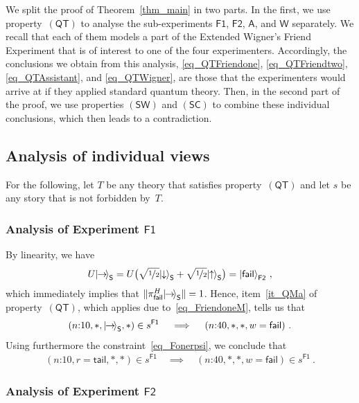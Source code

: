 \documentclass[12pt]{article}
\theoremstyle{plain}
\theoremstyle{definition}
\newcommand*{\ket}[1]{{| #1 \rangle}}
\newcommand*{\Friendone}{\mathsf{F1}}
\newcommand*{\Friendtwo}{\mathsf{F2}}
\newcommand*{\Assistant}{\mathsf{A}}
\newcommand*{\Wigner}{\mathsf{W}}
\newcommand*{\Spin}{\mathsf{S}}
\newcommand*{\spinup}{\ket{{\hspace{-0.1ex}\uparrow\hspace{-0.1ex}}}}
\newcommand*{\spindown}{\ket{{\hspace{-0.1ex}\downarrow\hspace{-0.1ex}}}}
\newcommand*{\spinright}{\ket{{\hspace{-0.2ex}\rightarrow\hspace{-0.4ex}}}}
\newcommand*{\QT}{\mathsf{(QT)}}
\newcommand*{\SW}{\mathsf{(SW)}}
\newcommand*{\SelfCons}{\mathsf{(SC)}}
\newcommand*{\fail}{\mathsf{fail}}
\newcommand*{\tail}{\mathsf{tail}}
\begin{document}
We split the proof of Theorem~\ref{thm_main} in two parts. In the first, we use property~$\QT$ to analyse the sub-experiments $\Friendone$, $\Friendtwo$, $\Assistant$, and $\Wigner$ separately.  We recall that each of them models a part of the Extended Wigner's Friend Experiment that is of interest to one of the four experimenters. Accordingly,  the conclusions we obtain from this analysis, \eqref{eq_QTFriendone}, \eqref{eq_QTFriendtwo},  \eqref{eq_QTAssistant}, and \eqref{eq_QTWigner}, are those that the experimenters would arrive at if they applied standard quantum theory.  Then, in the second part of the proof, we use properties $\SW$ and $\SelfCons$ to combine these individual conclusions, which then leads to a contradiction. 

\subsection{Analysis of individual views} \label{sec_analysisindividual}

For the following, let $T$ be any theory that satisfies property~$\QT$ and let $s$ be any story that is not forbidden by~$T$.

\subsubsection*{Analysis of Experiment $\Friendone$} 

 By linearity, we have
\begin{align*}
  U \spinright_\Spin 
  = U \bigl(  \sqrt{\nicefrac{1}{2}} \spindown_\Spin + \sqrt{\nicefrac{1}{2}} \spinup_\Spin \bigr) 
  = \ket{\fail}_{\Friendtwo}  \ ,
\end{align*}
which immediately implies that $\|\pi_{\fail}^H \spinright_{\Spin}\| = 1$. Hence, item~\ref{it_QMa} of property~$\QT$, which applies due to~\eqref{eq_FriendoneM},  tells us that
\begin{align*}
  (\text{$n$:10}, *, \spinright_{\Spin}, *) \in s^{\Friendone}  \quad \implies \quad  (\text{$n$:40}, *, *, w=\fail) \ .
\end{align*}
Using furthermore the constraint~\eqref{eq_Fonerpsi}, we conclude that
\begin{align} \label{eq_QTFriendone}
  (\text{$n$:10}, r=\tail, *, *) \in s^{\Friendone}  
  \quad \implies \quad
   (\text{$n$:40}, *, *, w=\fail) \in s^{\Friendone}  \ .
\end{align}

\subsubsection*{Analysis of Experiment $\Friendtwo$}  
\end{document}
